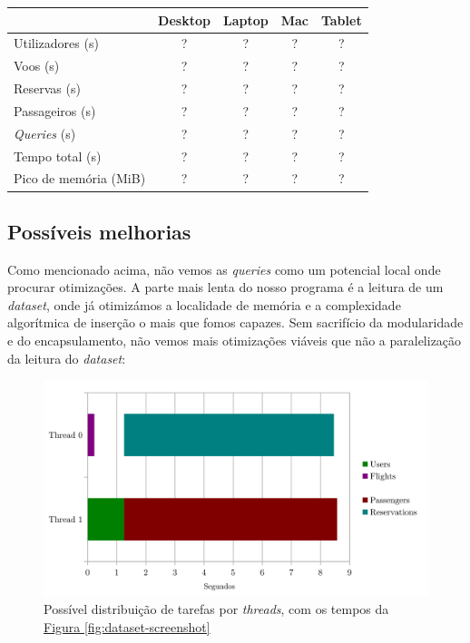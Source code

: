 \documentclass[11pt, a4paper]{article}
\begin{document}
\begin{center}
    \begin{tabular}{|l|c|c|c|c|}
        \hline
        & Desktop & Laptop & Mac & Tablet \\
        \hline
        Utilizadores (s) & ? & ? & ? & ? \\
        \hline
        Voos (s) & ? & ? & ? & ? \\
        \hline
        Reservas (s) & ? & ? & ? & ? \\
        \hline
        Passageiros (s) & ? & ? & ? & ? \\
        \hline
        \emph{Queries} (s) & ? & ? & ? & ? \\
        \hline
        Tempo total (s) & ? & ? & ? & ? \\
        \hline
        Pico de memória (MiB) & ? & ? & ? & ? \\
        \hline
    \end{tabular}
\end{center}


\subsection{Possíveis melhorias}
\label{sec:possible-performance-improvements}

Como mencionado acima, não vemos as \emph{queries} como um potencial local onde procurar
otimizações. A parte mais lenta do nosso programa é a leitura de um \emph{dataset}, onde já
otimizámos a localidade de memória e a complexidade algorítmica de inserção o mais que fomos
capazes. Sem sacrifício da modularidade e do encapsulamento, não vemos mais otimizações viáveis
que não a paralelização da leitura do \emph{dataset}:

\begin{figure}[h]
    \centering
    \includegraphics[scale=0.20]{res-fase2/threading.png}
    \caption{Possível distribuição de tarefas por \emph{threads}, com os tempos da
             \hyperref[fig:dataset-screenshot]{Figura \ref*{fig:dataset-screenshot}}}
    \label{fig:threading}
\end{figure}
\end{document}
